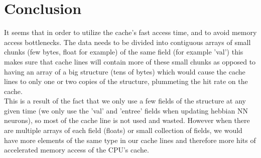 \documentclass {article}
\begin{document}
\section{Conclusion}
It seems that in order to utilize the cache's fast access time, and to avoid
memory access bottlenecks. The data needs to be divided into contiguous arrays
of small chunks (few bytes, float for example) of the same field (for example 'val')
this makes sure that cache lines will contain more of these small chunks as opposed
to having an array of a big structure (tens of bytes) which would cause the
cache lines to only one or two copies of the structure, plummeting the hit rate
on the cache.\\

This is a result of the fact that we only use a few fields of the structure at
any given time (we only use the 'val' and 'entree' fields when updating hebbian
NN neurons), so most of the cache line is not used and wasted. However when there
are multiple arrays of each field (floats) or small collection of
fields, we would have more elements of the same type in our cache lines and
therefore more hits of accelerated memory access of the CPU's cache.

\newpage

 

\end{document}
